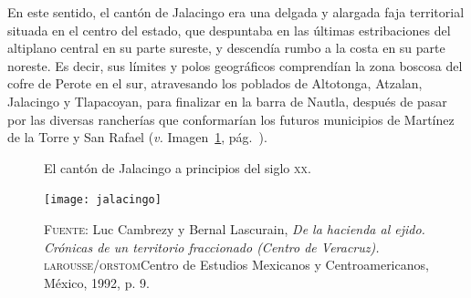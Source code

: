 \documentclass[14pt,twoside,final]{extbook} %
\begin{document}
En este sentido, el cantón de Jalacingo era una delgada y alargada faja territorial situada en el centro del estado, que despuntaba en las últimas estribaciones del altiplano central en su parte sureste, y descendía rumbo a la costa en su parte noreste. Es decir, sus límites y polos geográficos comprendían la zona boscosa del cofre de Perote en el sur, atravesando los poblados de Altotonga, Atzalan, Jalacingo y Tlapacoyan, para finalizar en la barra de Nautla, después de pasar por las diversas rancherías que conformarían los futuros municipios de Martínez de la Torre y San Rafael (\emph{v.} Imagen~\ref{fig:jalacingo-principios-xx}, pág.~\pageref{fig:jalacingo-principios-xx}).
\begin{figure}
\caption[El cantón de Jalacingo a principios del siglo \textsc{xx}]{El cantón de Jalacingo a principios del siglo \textsc{xx}.}
\texttt{[image: jalacingo]}
\caption*{\textsc{Fuente:} Luc Cambrezy y Bernal Lascurain, \emph{De la hacienda al ejido. Crónicas de un territorio fraccionado (Centro de Veracruz).} \textsc{larousse/orstom} Centro de Estudios Mexicanos y Centroamericanos, México, 1992, p. 9.}
\label{fig:jalacingo-principios-xx}
\end{figure}
\end{document}
